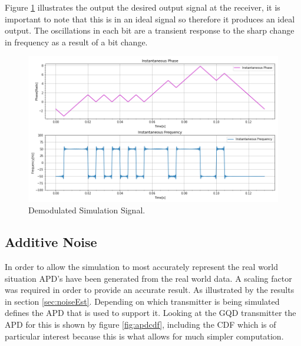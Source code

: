 Figure \ref{fig:simDemod} illustrates the output the desired output signal at the receiver, it is important to note that this is in an ideal signal so therefore it produces an ideal output. The oscillations in each bit are a transient response to the sharp change in frequency as a result of a bit change. 

\begin{figure}[h!]
    \centering
    \includegraphics[width = \textwidth]{figs/sim/simDemod.png}
    \caption{Demodulated Simulation Signal.}
    \label{fig:simDemod}
\end{figure}

\pagebreak
\subsection{Additive Noise}
In order to allow the simulation to most accurately represent the real world situation APD's have been generated from the real world data. A scaling factor was required in order to provide an accurate result. As illustrated by the results in section \ref{sec:noiseEst}. Depending on which transmitter is being simulated defines the APD that is used to support it. Looking at the GQD transmitter the APD for this is shown by figure \ref{fig:apdcdf}, including the CDF which is of particular interest because this is what allows for much simpler computation.

